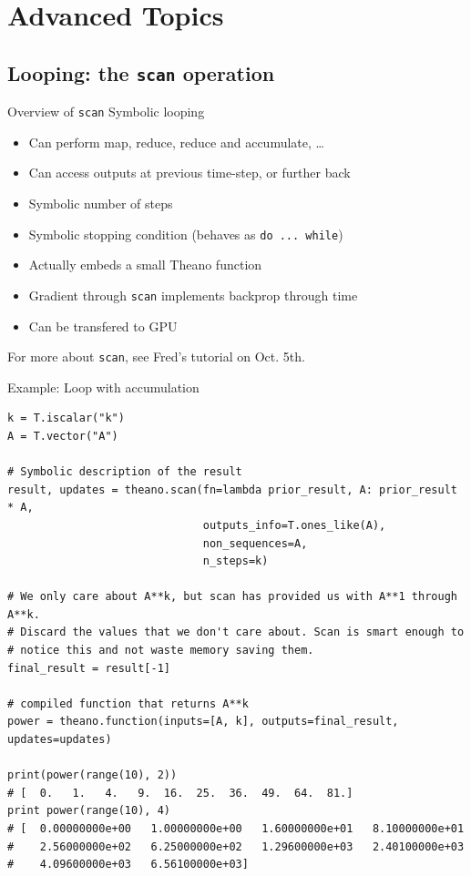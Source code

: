 \documentclass[a4paper,9pt]{beamer}
\begin{document}
\section{Advanced Topics}
\begin{frame}
  \tableofcontents[currentsection]
\end{frame}

\subsection{Looping: the {\tt scan} operation}
\begin{frame}[fragile]{Overview of {\tt scan}}
  Symbolic looping
  \begin{itemize}
    \item Can perform map, reduce, reduce and accumulate, \ldots
    \item Can access outputs at previous time-step, or further back
    \item Symbolic number of steps
    \item Symbolic stopping condition (behaves as \verb|do ... while|)
    \item Actually embeds a small Theano function
    \item Gradient through \verb|scan| implements backprop through time
    \item Can be transfered to GPU
  \end{itemize}
  For more about \verb|scan|, see Fred's tutorial on Oct. 5th.
\end{frame}

\begin{frame}[fragile]{Example: Loop with accumulation}
  \footnotesize
    \begin{verbatim}
k = T.iscalar("k")
A = T.vector("A")

# Symbolic description of the result
result, updates = theano.scan(fn=lambda prior_result, A: prior_result * A,
                              outputs_info=T.ones_like(A),
                              non_sequences=A,
                              n_steps=k)

# We only care about A**k, but scan has provided us with A**1 through A**k.
# Discard the values that we don't care about. Scan is smart enough to
# notice this and not waste memory saving them.
final_result = result[-1]

# compiled function that returns A**k
power = theano.function(inputs=[A, k], outputs=final_result, updates=updates)

print(power(range(10), 2))
# [  0.   1.   4.   9.  16.  25.  36.  49.  64.  81.]
print power(range(10), 4)
# [  0.00000000e+00   1.00000000e+00   1.60000000e+01   8.10000000e+01
#    2.56000000e+02   6.25000000e+02   1.29600000e+03   2.40100000e+03
#    4.09600000e+03   6.56100000e+03]
  \end{verbatim}
\end{frame}
\end{document}
